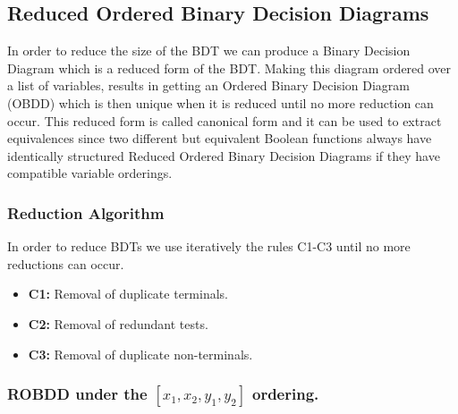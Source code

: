 \documentclass[a4paper]{article}
\begin{document}
\subsection*{Reduced Ordered Binary Decision Diagrams}
In order to reduce the size of the BDT we can produce a 
Binary Decision Diagram which is a reduced form of the BDT.
Making this diagram ordered over a list of variables, results in getting an Ordered Binary Decision Diagram (OBDD) which is
then unique when it is reduced until no more reduction can occur. This reduced form is called canonical form and it can be used to
extract equivalences since two different but equivalent Boolean functions always have identically structured Reduced Ordered Binary Decision Diagrams 
if they have compatible variable orderings.
\subsubsection*{Reduction Algorithm}
\noindent In order to reduce BDTs we use iteratively the rules C1-C3 until no more reductions can occur.

\begin{itemize}
\item {\bf C1:} Removal of duplicate terminals. 
\item {\bf C2:} Removal of redundant tests. 
\item {\bf C3:} Removal of duplicate non-terminals. 
\end{itemize}




\subsubsection*{ROBDD under the $[x_1,x_2,y_1,y_2]$ ordering.}
\end{document}
